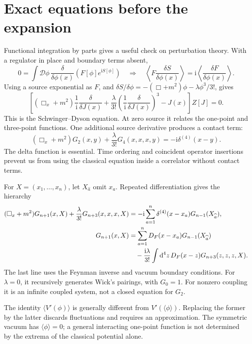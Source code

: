 \documentclass[11pt]{article}
\newcommand{\dd}{\mathrm d}
\newcommand{\ii}{\mathrm i}
\newcommand{\D}{\mathcal D}
\newcommand{\module}[1]{\clearpage\section{#1}}
\begin{document}
\module{Exact equations before the expansion}
Functional integration by parts gives a useful check on perturbation
theory. With a regulator in place and boundary terms absent,
\begin{equation}
 0=\int\D\phi\,\frac{\delta}{\delta\phi(x)}
 \left(F[\phi]e^{\ii S[\phi]}\right)
 \quad\Longrightarrow\quad
 \left\langle F\frac{\delta S}{\delta\phi(x)}\right\rangle
 =\ii\left\langle\frac{\delta F}{\delta\phi(x)}\right\rangle.
 \label{eq:ibp}
\end{equation}
Using a source exponential as \(F\), and
\(\delta S/\delta\phi=-(\Box+m^2)\phi-\lambda\phi^3/3!\), gives
\begin{equation}
 \left[(\Box_x+m^2)\frac{1}{\ii}\frac{\delta}{\delta J(x)}
 +\frac{\lambda}{3!}\left(\frac{1}{\ii}\frac{\delta}{\delta J(x)}\right)^3
 -J(x)\right]Z[J]=0.                              \label{eq:SD}
\end{equation}
This is the Schwinger--Dyson equation. At zero source it relates the
one-point and three-point functions. One additional source derivative
produces a contact term:
\begin{equation}
 (\Box_x+m^2)G_2(x,y)+\frac{\lambda}{3!}G_4(x,x,x,y)
 =-\ii\delta^{(4)}(x-y).                          \label{eq:SD2}
\end{equation}
The delta function is essential. Time ordering and coincident operator
insertions prevent us from using the classical equation inside a
correlator without contact terms.

For \(X=(x_1,\ldots,x_n)\), let \(X_{\widehat a}\) omit \(x_a\).
Repeated differentiation gives the hierarchy
\begin{align}
 (\Box_x+m^2)G_{n+1}(x,X)+\frac{\lambda}{3!}G_{n+3}(x,x,x,X)
 &=-\ii\sum_{a=1}^n\delta^{(4)}(x-x_a)G_{n-1}(X_{\widehat a}),
 \label{eq:hierarchy}\\
 G_{n+1}(x,X)&=\sum_{a=1}^nD_F(x-x_a)G_{n-1}(X_{\widehat a})\notag\\
 &\quad-\frac{\ii\lambda}{3!}\int\dd^4z\,
 D_F(x-z)G_{n+3}(z,z,z,X).                        \label{eq:integralSD}
\end{align}
The last line uses the Feynman inverse and vacuum boundary conditions.
For \(\lambda=0\), it recursively generates Wick's pairings, with
\(G_0=1\). For nonzero coupling it is an infinite coupled system, not
a closed equation for \(G_2\).

\begin{remarkbox}
The identity \(\langle V'(\phi)\rangle\) is generally different from
\(V'(\langle\phi\rangle)\). Replacing the former by the latter discards
fluctuations and requires an approximation. The symmetric vacuum has
\(\langle\phi\rangle=0\); a general interacting one-point function is
not determined by the extrema of the classical potential alone.
\end{remarkbox}
\end{document}
